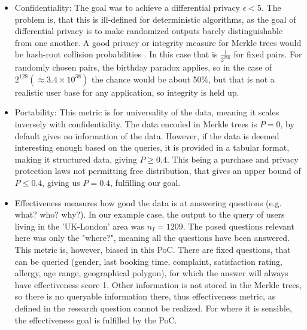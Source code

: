 \documentclass[a4paper,11pt]{report} %
\theoremstyle{change}
\theoremstyle{theoremstyle}
\begin{document}
\begin{itemize}
    Which larger than one, making it fail our criteria. This would always be the case however, unless the buyer is looking for something that is true for a majority in the database. With an increasing number of Buyers this will not change, because if they are looking to match the same criteria, they are going to get the same score, if they are matching something different, the criteria changes and cannot be counted towards the previous ones. The accuracy measure for this case seems to have been poorly defined. The Buyer is interested in users data, who is matching a profile. Accuracy should be calculated on the Buyers own goals of the data, or the truthfulness of the data provided by the user. It is unrealistic for this thesis to measure cases e.g. "How many users has actually bought a product the Buyer company advertised them from the customers data we provided". That leaves the second option, having to confirm truthfulness of the data with the users. The data is pseudo-anonymised in a way that is losing minimal information, and there is a way for the Governor entity to confirm validity of the data with the user, but that is sadly out of the scope of this thesis.
    \item Confidentiality: The goal was to achieve a differential privacy $\epsilon < 5$. The problem is, that this is ill-defined for deterministic algorithms, as the goal of differential privacy is to make randomized outputs barely distinguishable from one another\cite{sharma2021differential}. A good privacy or integrity measure for Merkle trees would be hash-root collision probabilities \cite{kuznetsov2024merkle}. In this case that is $\frac{1}{2^{256}}$ for fixed pairs. For randomly chosen pairs, the birthday paradox applies, so in the case of $2^{128} (\approx 3.4 \times 10^{38})$ the chance would be about 50\%, but that is not a realistic user base for any application, so integrity is held up.
    \item Portability: This metric is for universality of the data, meaning it scales inversely with confidentiality. The data encoded in Merkle trees is $P=0$, by default gives no information of the data. However, if the data is deemed interesting enough based on the queries, it is provided in a tabular format, making it structured data, giving $P \geq 0.4$. This being a purchase and privacy protection laws not permitting free distribution, that gives an upper bound of $P\leq0.4$, giving us $P=0.4$, fulfilling our goal.
    \item Effectiveness measures how good the data is at answering questions (e.g. what? who? why?). In our example case, the output to the query of users living in the 'UK-London' area was $n_I=1209$. The posed questions relevant here was only the "where?", meaning all the questions have been answered. This metric is, however, biased in this PoC. There are fixed questions, that can be queried (gender, last booking time, complaint, satisfaction rating, allergy, age range, geographical polygon), for which the answer will always have effectiveness score 1. Other information is not stored in the Merkle trees, so there is no queryable information there, thus effectiveness metric, as defined in the research question cannot be realized. For where it is sensible, the effectiveness goal is fulfilled by the PoC.

\end{itemize}
\end{document}
